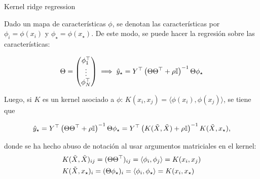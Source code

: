 \documentclass[9pt]{beamer}
\begin{document}
\begin{frame}{Kernel ridge regression}

Dado un mapa de características $\phi$, se denotan las características por $\phi_i=\phi(x_i)$ y $\phi_\star = \phi(x_\star)$. De este modo, se puede hacer la regresión sobre las características:

\begin{equation*}
	\Theta=\left(\begin{matrix}
		\phi_1^\top\\
		\vdots\\
		\phi_N^\top
	\end{matrix}\right) \implies \hat{y}_\star = Y^\top \left(\Theta\Theta^\top + \rho{\mathbb I}\right)^{-1}\Theta \phi_\star
\end{equation*}\pause

Luego, si $K$ es un kernel asociado a $\phi$: $K(x_i,x_j)=\langle\phi(x_i),\phi(x_j)\rangle$, se tiene que


\begin{equation*}
    \hat{y}_\star = Y^\top \left(\Theta\Theta^\top + \rho{\mathbb I}\right)^{-1}\Theta \phi_\star  = Y^\top \left(K(\tilde{X},\tilde{X}) + \rho{\mathbb I}\right) ^{-1} K(\tilde{X}, x_\star),    
\end{equation*}

donde se ha hecho abuso de notación al usar argumentos matriciales en el kernel:
\begin{align*}
	&K(\tilde{X},\tilde{X})_{ij} = (\Theta\Theta^\top)_{ij} = \langle\phi_i,\phi_j\rangle = K(x_i,x_j)\\
	& K(\tilde{X},x_\star)_i = (\Theta\phi_\star)_i = \langle\phi_i,\phi_\star\rangle = K(x_i,x_\star)
\end{align*}
	
\end{frame}
\end{document}
